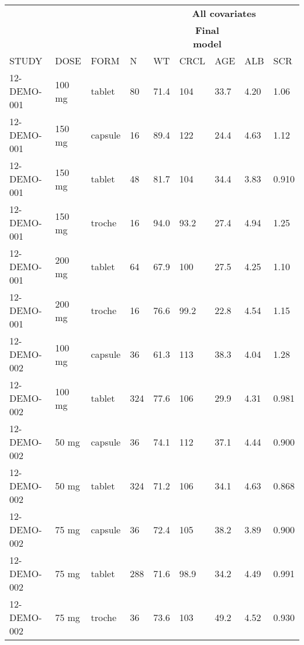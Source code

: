 {\def\arraystretch{1.4}\tabcolsep=5pt
\begin{threeparttable}
\begin{tabular}[h]{lllllllll}
\hline
\multicolumn{4}{c}{} & \multicolumn{5}{c}{\textbf{All covariates}}\\
\cmidrule(lr){5-9}
\multicolumn{5}{c}{} & \multicolumn{2}{c}{\textbf{Final model}} & \multicolumn{2}{c}{}\\
\cmidrule(lr){6-7}
STUDY & DOSE & FORM & N & WT & CRCL & AGE & ALB & SCR \\
\hline
12-DEMO-001 & 100 mg & tablet & 80 & 71.4 & 104 & 33.7 & 4.20 & 1.06 \\
12-DEMO-001 & 150 mg & capsule & 16 & 89.4 & 122 & 24.4 & 4.63 & 1.12 \\
12-DEMO-001 & 150 mg & tablet & 48 & 81.7 & 104 & 34.4 & 3.83 & 0.910 \\
12-DEMO-001 & 150 mg & troche & 16 & 94.0 & 93.2 & 27.4 & 4.94 & 1.25 \\
12-DEMO-001 & 200 mg & tablet & 64 & 67.9 & 100 & 27.5 & 4.25 & 1.10 \\
12-DEMO-001 & 200 mg & troche & 16 & 76.6 & 99.2 & 22.8 & 4.54 & 1.15 \\
12-DEMO-002 & 100 mg & capsule & 36 & 61.3 & 113 & 38.3 & 4.04 & 1.28 \\
12-DEMO-002 & 100 mg & tablet & 324 & 77.6 & 106 & 29.9 & 4.31 & 0.981 \\
12-DEMO-002 & 50 mg & capsule & 36 & 74.1 & 112 & 37.1 & 4.44 & 0.900 \\
12-DEMO-002 & 50 mg & tablet & 324 & 71.2 & 106 & 34.1 & 4.63 & 0.868 \\
12-DEMO-002 & 75 mg & capsule & 36 & 72.4 & 105 & 38.2 & 3.89 & 0.900 \\
12-DEMO-002 & 75 mg & tablet & 288 & 71.6 & 98.9 & 34.2 & 4.49 & 0.991 \\
12-DEMO-002 & 75 mg & troche & 36 & 73.6 & 103 & 49.2 & 4.52 & 0.930 \\
\hline
\end{tabular}
\end{threeparttable}
}
